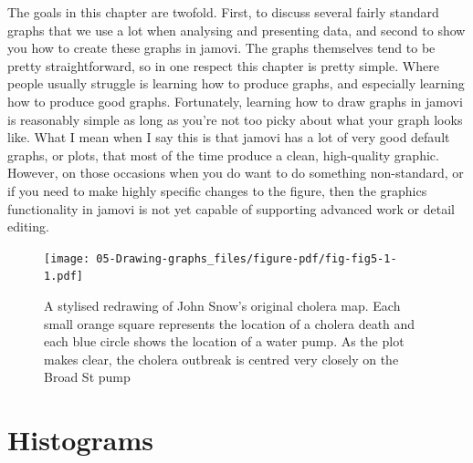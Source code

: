 \documentclass[
  a4paper,
]{book}
\begin{document}
The goals in this chapter are twofold. First, to discuss several fairly
standard graphs that we use a lot when analysing and presenting data,
and second to show you how to create these graphs in jamovi. The graphs
themselves tend to be pretty straightforward, so in one respect this
chapter is pretty simple. Where people usually struggle is learning how
to produce graphs, and especially learning how to produce good graphs.
Fortunately, learning how to draw graphs in jamovi is reasonably simple
as long as you're not too picky about what your graph looks like. What I
mean when I say this is that jamovi has a lot of very good default
graphs, or plots, that most of the time produce a clean, high-quality
graphic. However, on those occasions when you do want to do something
non-standard, or if you need to make highly specific changes to the
figure, then the graphics functionality in jamovi is not yet capable of
supporting advanced work or detail editing.

\begin{figure}

\texttt{[image: 05-Drawing-graphs\_files/figure-pdf/fig-fig5-1-1.pdf]} \hfill{}

\caption{\label{fig-fig5-1}A stylised redrawing of John Snow's original
cholera map. Each small orange square represents the location of a
cholera death and each blue circle shows the location of a water pump.
As the plot makes clear, the cholera outbreak is centred very closely on
the Broad St pump}

\end{figure}

\hypertarget{sec-Histograms}{%
\section{Histograms}\label{sec-Histograms}}
\end{document}
